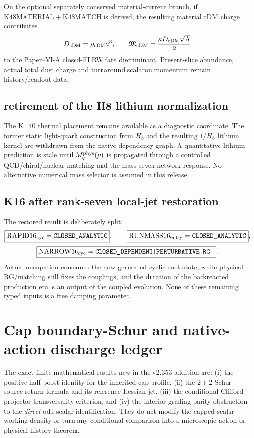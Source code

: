 \documentclass[12pt,a4paper]{article}
\begin{document}
On the optional separately conserved material-current branch, if
$\mathrm{K48MATERIAL}+\mathrm{K48MATCH}$ is derived, the resulting material
cDM charge contributes
\[
 D_{\rm cDM}=\rho_{\rm cDM}a^3,
 \qquad
 \mathfrak M_{\rm cDM}=\frac{\kappa D_{\rm cDM}\sqrt\Lambda}{2}
\]
to the Paper--VI-A closed-FLRW fate discriminant.  Present-slice abundance,
actual total dust charge and turnaround scalaron momentum remain history/readout
data.


\subsection{retirement of the H8 lithium normalization}
\label{p9:sec:v184-h8-retirement}
The K=40 thermal placement remains available as a diagnostic coordinate.  The former static light-quark construction from
\(H_8\) and the resulting \(1/H_8\) lithium kernel are withdrawn from the
native dependency graph.  A quantitative lithium prediction is stale until
\(M_q^{\rm phys}(\mu)\) is propagated through a controlled QCD/chiral/nuclear
matching and the mass-seven network response.  No alternative numerical mass
selector is assumed in this release.


\subsection*{K16 after rank-seven local-jet restoration}
The restored result is deliberately split:
\[
 \boxed{\mathrm{RAPID16}_{\rm cyc}=\texttt{CLOSED\_ANALYTIC}},\qquad
 \boxed{\mathrm{RUNMASS16}_{\rm entry}=\texttt{CLOSED\_ANALYTIC}},
\]
\[
 \boxed{\mathrm{NARROW16}_{\rm cyc}
 =\texttt{CLOSED\_DEPENDENT[PERTURBATIVE\ RG]}}.
\]
Actual occupation consumes the now-generated cyclic root state, while physical RG/matching
still fixes the couplings, and the duration of the backreacted production era
is an output of the coupled evolution.  None of these remaining typed inputs
is a free damping parameter.



\printbibliography


\section{Cap boundary-Schur and native-action discharge ledger}
\label{p6c:sec:v353-native-cap-ledger}
The exact finite mathematical results new in the v2.353 addition are:
(i) the positive half-boost identity for the inherited cap profile,
(ii) the $2+2$ Schur source-return formula and its reference Hessian
jet, (iii) the conditional Clifford-projector transversality
criterion, and (iv) the interior grading-parity obstruction to the
\emph{direct} odd-scalar identification.  They do not modify the
capped scalar working density or turn any conditional comparison
into a microscopic-action or physical-history theorem.
\end{document}
